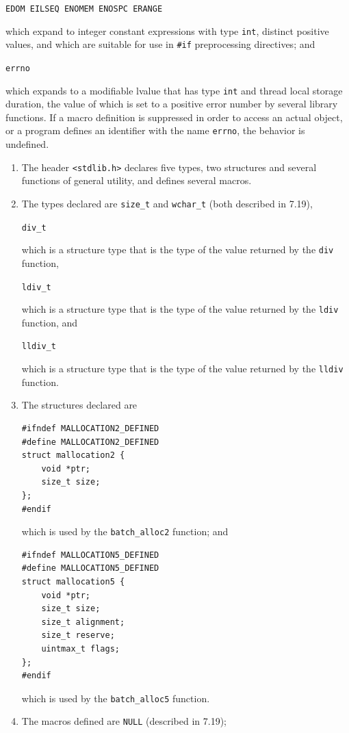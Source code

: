 \documentclass[wd]{isov2}
\begin{document}
{\begin{enumerate}
\texttt{EDOM\linebreak
EILSEQ\linebreak
\textcolor{changed}{ENOMEM}\linebreak
\textcolor{changed}{ENOSPC}\linebreak
ERANGE}

which expand to integer constant expressions with type \texttt{int}, distinct positive values, and which are suitable for use in \texttt{\#if} preprocessing directives; and

\texttt{errno}

which expands to a modifiable lvalue that has type \texttt{int} and thread local storage duration, the value of which is set to a positive error number by several library functions. If a macro definition is suppressed in order to access an actual object, or a program defines an identifier with the name \texttt{errno}, the behavior is undefined.
\end{enumerate}

\begin{enumerate}
\renewcommand{\theenumi}{\arabic{enumi}}
\item The header \texttt{<stdlib.h>} declares five types\textcolor{changed}{, two structures} and several functions of general utility, and defines several macros.
\item The types declared are \texttt{size\_t} and \texttt{wchar\_t} (both described in 7.19),

\texttt{div\_t}

which is a structure type that is the type of the value returned by the \texttt{div} function,

\texttt{ldiv\_t}

which is a structure type that is the type of the value returned by the \texttt{ldiv} function, and

\texttt{lldiv\_t}

which is a structure type that is the type of the value returned by the \texttt{lldiv} function.
\color{changed}
\item The structures declared are
\begin{verbatim}
#ifndef MALLOCATION2_DEFINED
#define MALLOCATION2_DEFINED
struct mallocation2 {
    void *ptr;
    size_t size;
};
#endif
\end{verbatim}
which is used by the \texttt{batch\_alloc2} function; and
\begin{verbatim}
#ifndef MALLOCATION5_DEFINED
#define MALLOCATION5_DEFINED
struct mallocation5 {
    void *ptr;
    size_t size;
    size_t alignment;
    size_t reserve;
    uintmax_t flags;
};
#endif
\end{verbatim}
which is used by the \texttt{batch\_alloc5} function.
\color{black}
\item The macros defined are \texttt{NULL} (described in 7.19);


\end{enumerate}}
\end{document}
